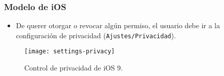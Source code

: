 \begin{frame}
 \frametitle{Modelo de iOS}
 \begin{itemize}
  \item De querer otorgar o revocar algún permiso, el usuario debe ir a la configuración de privacidad (\texttt{Ajustes/Privacidad}).
 \end{itemize}
 \begin{figure}[hbtp]
    \centering
    \texttt{[image: settings-privacy]}
    \caption{Control de privacidad de iOS 9.}
 \end{figure}
\end{frame}
